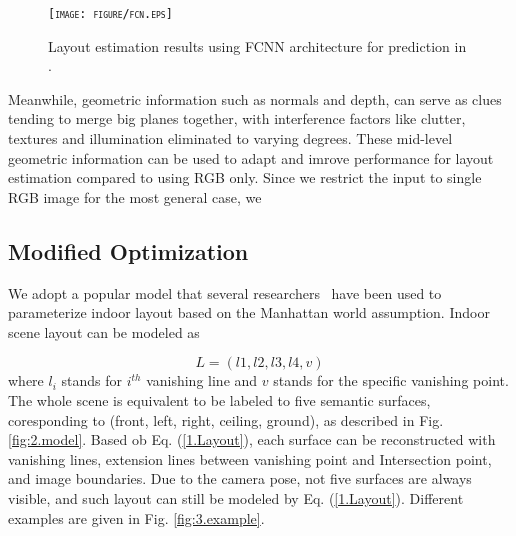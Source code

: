 \begin{figure}[!htq]
	\centering 
	\textsc{\texttt{[image: figure/fcn.eps]}}
	\caption{Layout estimation results using FCNN architecture for prediction in \cite{dasgupta2016delay} \cite{ren2016coarse}.}
	\label{fig:fcn}
\end{figure}



Meanwhile, geometric information such as normals and depth, can serve as clues tending to merge big planes together, with interference factors like clutter, textures and illumination eliminated to varying degrees. These mid-level geometric information can be used to adapt and imrove performance for layout estimation compared to using RGB only. Since we restrict the input to single RGB image for the most general case, we 






\subsection{Modified Optimization}
\label{subsection:optimization}
We adopt a popular model that several  researchers~\cite{hedau2009recovering,dasgupta2016delay,ren2016coarse} have been used to parameterize indoor layout based on the Manhattan world assumption. 
Indoor scene layout can be modeled as 

\begin{equation}
	\label{eq:Layout}
	L = (l1, l2, l3, l4, v)
\end{equation}
where $l_{i}$ stands for $i^{th}$ vanishing line and $v$ stands for the specific vanishing point. The whole scene is equivalent to be labeled to five semantic surfaces, coresponding to (front, left, right, ceiling, ground), as described in Fig. \ref{fig:2.model}. Based ob Eq. (\ref{1.Layout}), each surface can be reconstructed with vanishing lines, extension lines between vanishing point and Intersection point, and image boundaries. Due to the camera pose, not five surfaces are always visible, and such layout can still be modeled by Eq. (\ref{1.Layout}). Different examples are given in Fig. \ref{fig:3.example}.